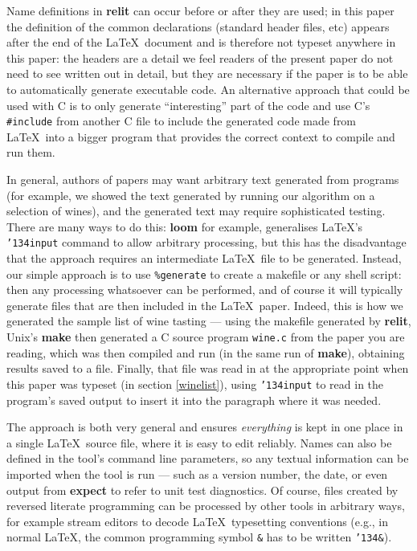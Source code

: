 \documentclass[12pt]{article}
\def\name#1{\textbf{#1}}
\begin{document}
Name definitions in \name{relit} can occur before or after they are used; in this paper the definition of the common declarations (standard header files, etc) appears after the end of the \LaTeX\ document and is therefore not typeset anywhere in this paper: the headers are a detail we feel readers of the present paper do not need to see written out in detail, but they are necessary if the paper is to be able to automatically generate executable code. An alternative approach that could be used with C is to only generate ``interesting'' part of the code and use C's \texttt{\#include} from another C file to include the generated code made from \LaTeX\ into a bigger program that provides the correct context to compile and run them.

In general, authors of papers may want arbitrary text generated from programs (for example, we showed the text generated by running our algorithm on a selection of wines), and the generated text may require sophisticated testing. There are many ways to do this: \name{loom} for example, generalises \LaTeX's \texttt{\char'134input} command to allow arbitrary processing, but this has the disadvantage that the approach requires an intermediate \LaTeX\ file to be generated. Instead, our simple approach is to use \texttt{\%{}generate} to create a makefile or any shell script: then any processing whatsoever can be performed, and of course it will typically generate files that are then included in the \LaTeX\ paper. Indeed, this is how we generated the sample list of wine tasting --- using the makefile generated by \name{relit}, Unix's \name{make} then generated a C source program \texttt{wine.c} from the paper you are reading, which was then compiled and run (in the same run of \name{make}), obtaining results saved to a file. Finally, that file was read in at the appropriate point when this paper was typeset (in section \ref{winelist}), using \texttt{\char'134input} to read in the program's saved output to insert it into the paragraph where it was needed. 

The approach is both very general and ensures \emph{everything\/} is kept in one place in a single \LaTeX\ source file, where it is easy to edit reliably. Names can also be defined in the tool's command line parameters, so any textual information can be imported when the tool is run --- such as a version number, the date, or even output from \name{expect} to refer to unit test diagnostics. Of course, files created by reversed literate programming can be processed by other tools in arbitrary ways, for example stream editors to decode \LaTeX\ typesetting conventions (e.g., in normal \LaTeX, the common programming symbol \texttt{\&} has to be written \texttt{\char'134\&}).
\end{document}

